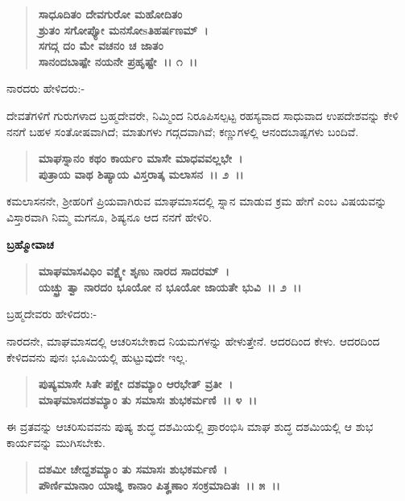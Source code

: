 \begin{verse}
\textbf{ಸಾಧೂದಿತಂ ದೇವಗುರೋ ಮಹೋದಿತಂ}\\\textbf{ಶ್ರುತಂ ಸಗೋಪ್ಯೋ ಮನಸೋsತಿಹರ್ಷಣಮ್~।}\\\textbf{ಸಗದ್ಗ ದಂ ಮೇ ವಚನಂ ಚ ಜಾತಂ}\\\textbf{ಸಾನಂದಬಾಷ್ಪೇ ನಯನೇ ಪ್ರಹೃಷ್ಟೇ~।। ೧~।।}
\end{verse}

\begin{flushleft}
ನಾರದರು ಹೇಳಿದರು:-
\end{flushleft}

ದೇವತೆಗಳಿಗೆ ಗುರುಗಳಾದ ಬ್ರಹ್ಮದೇವರೇ, ನಿಮ್ಮಿಂದ ನಿರೂಪಿಸಲ್ಪಟ್ಟ ರಹಸ್ಯವಾದ ಸಾಧುವಾದ ಉಪದೇಶವನ್ನು ಕೇಳಿ ನನಗೆ ಬಹಳ ಸಂತೋಷವಾಗಿದೆ; ಮಾತುಗಳು ಗದ್ಗದವಾಗಿವೆ; ಕಣ್ಣುಗಳಲ್ಲಿ ಆನಂದಬಾಷ್ಪಗಳು ಬಂದಿವೆ.

\begin{verse}
\textbf{ಮಾಘಸ್ನಾನಂ ಕಥಂ ಕಾರ್ಯಂ ಮಾಸೇ ಮಾಧವವಲ್ಲಭೇ~।}\\\textbf{ಪುತ್ರಾಯ ವಾಥ ಶಿಷ್ಯಾಯ ವಿಸ್ತರಾತ್ಕ ಮಲಾಸನ~।। ೨~।।}
\end{verse}

ಕಮಲಾಸನನೇ, ಶ‍್ರೀಹರಿಗೆ ಪ್ರಿಯವಾಗಿರುವ ಮಾಘಮಾಸದಲ್ಲಿ ಸ್ನಾನ ಮಾಡುವ ಕ್ರಮ ಹೇಗೆ ಎಂಬ ವಿಷಯವನ್ನು ವಿಸ್ತಾರವಾಗಿ ನಿಮ್ಮ ಮಗನೂ, ಶಿಷ್ಯನೂ ಆದ ನನಗೆ ಹೇಳಿರಿ.

\begin{flushleft}
\textbf{ಬ್ರಹ್ಮೋವಾಚ \enginline{-}}
\end{flushleft}

\begin{verse}
\textbf{ಮಾಘಮಾಸವಿಧಿಂ ವಕ್ಷ್ಯೇ ಶೃಣು ನಾರದ ಸಾದರಮ್~।}\\\textbf{ಯಚ್ಛ್ರು ತ್ವಾ ನಾರದಂ ಭೂಯೋ ನ ಭೂಯೋ ಜಾಯತೇ ಭುವಿ~।। ೨~।।}
\end{verse}

\begin{flushleft}
ಬ್ರಹ್ಮದೇವರು ಹೇಳಿದರು:-
\end{flushleft}

ನಾರದನೇ, ಮಾಘಮಾಸದಲ್ಲಿ ಆಚರಿಸಬೇಕಾದ ನಿಯಮಗಳನ್ನು ಹೇಳುತ್ತೇನೆ. ಆದರದಿಂದ ಕೇಳು. ಆದರದಿಂದ ಕೇಳಿದವನು ಪುನಃ ಭೂಮಿಯಲ್ಲಿ ಹುಟ್ಟುವುದೇ ಇಲ್ಲ.

\begin{verse}
\textbf{ಪುಷ್ಯಮಾಸೇ ಸಿತೇ ಪಕ್ಷೇ ದಶಮ್ಯಾಂ ಆರಭೇತ್ ವ್ರತೀ~।}\\\textbf{ಮಾಘಮಾಸದಶಮ್ಯಾಂ ತು ಸಮಾಸಃ ಶುಭಕರ್ಮಣಿ~।। ೪~।।}
\end{verse}

ಈ ವ್ರತವನ್ನು ಆಚರಿಸುವವನು ಪುಷ್ಯ ಶುದ್ಧ ದಶಮಿಯಲ್ಲಿ ಪ್ರಾರಂಭಿಸಿ ಮಾಘ ಶುದ್ಧ ದಶಮಿಯಲ್ಲಿ ಆ ಶುಭ ಕಾರ್ಯವನ್ನು ಮುಗಿಸಬೇಕು.

\begin{verse}
\textbf{ದಶಮೀ ಚೇದ್ದಶಮ್ಯಾಂ ತು ಸಮಾಸಃ ಶುಭಕರ್ಮಣಿ~।}\\\textbf{ಪೌರ್ಣಿಮಾನಾಂ ಯಾಜ್ಞಿ ಕಾನಾಂ ಪಿತೄಣಾಂ ಸಂಕ್ರಮಾದಿತಃ~।। ೫~।।}
\end{verse}

